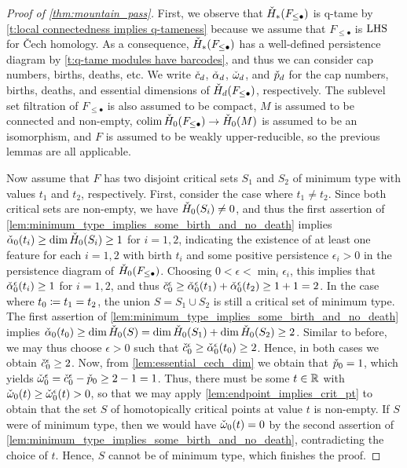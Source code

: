 \begin{proof}[Proof of \cref{thm:mountain_pass}]
    First, we observe that $\check{H}_*(F_{\leq \bullet})$ is q-tame by \cref{t:local connectedness implies q-tameness} because we assume that $F_{\leq \bullet}$ is $\mathrm{LHS}$ for \v{C}ech homology.
    As a consequence, $\check{H}_*(F_{\leq \bullet})$ has a well-defined persistence diagram by \cref{t:q-tame modules have barcodes}, and thus we can consider cap numbers, births, deaths, etc.
    We write $\check{c}_d$, $\check{\alpha}_d$, $\check{\omega}_d$, and $\check{p}_d$ for the cap numbers, births, deaths, and essential dimensions of $\check{H}_d(F_{\leq \bullet})$, respectively.
    The sublevel set filtration of $F_{\leq \bullet}$ is also assumed to be compact, $M$ is assumed to be connected and non-empty, $\operatorname*{colim} \check{H}_0(F_{\leq \bullet}) \to \check{H}_0(M)$ is assumed to be an isomorphism, and $F$ is assumed to be weakly upper-reducible, so the previous lemmas are all applicable.

	Now assume that $F$ has two disjoint critical sets $S_{1}$ and $S_{2}$ of minimum type with values $t_{1}$ and $t_{2}$, respectively.
	First, consider the case where $t_{1} \neq t_{2}$.
	Since both critical sets are non-empty, we have $\check{H}_{0}(S_{i}) \neq 0$, and thus the first assertion of \cref{lem:minimum_type_implies_some_birth_and_no_death} implies $\check{\alpha}_{0}(t_{i}) \geq \dim \check{H}_0(S_{i}) \geq 1$ for $i = 1,2$,
	indicating the existence of at least one feature for each $i = 1,2$ with birth $t_{i}$ and some positive persistence $\epsilon_i > 0$ in the persistence diagram of $\check{H}_0(F_{\leq \bullet})$.
	Choosing $0 < \epsilon < \min_i \epsilon_i$, this implies that
	$\check{\alpha}_{0}^{\epsilon}(t_{i}) \geq 1$ for $i = 1,2$,
	and thus
	$\check{c}_{0}^{\epsilon} \geq \check{\alpha}_{0}^{\epsilon}(t_{1}) + \check{\alpha}_{0}^{\epsilon}(t_{2}) \geq 1 + 1 = 2$.
	In the case where $t_{0} \coloneqq t_{1} = t_{2}$, the union $S = S_{1} \cup S_{2}$ is still a critical set of minimum type.
	The first assertion of \cref{lem:minimum_type_implies_some_birth_and_no_death} implies $\check{\alpha}_{0}(t_{0}) \geq \dim \check{H}_0(S) = \dim \check{H}_{0}(S_{1}) + \dim \check{H}_{0}(S_{2}) \geq 2$.
	Similar to before, we may thus choose $\epsilon > 0$ such that $\check{c}_{0}^{\epsilon} \geq \check{\alpha}_{0}^{\epsilon}(t_{0}) \geq 2$.
	Hence, in both cases we obtain $\check{c}_{0}^{\epsilon} \geq 2$.
	Now, from \cref{lem:essential_cech_dim} we obtain that $\check{p}_{0} = 1$, which yields $\check{\omega}_{0}^{\epsilon} = \check{c}_{0}^{\epsilon} - \check{p}_{0} \geq 2 - 1 = 1$.
	Thus, there must be some $t \in \mathbb{R}$ with $\check{\omega}_{0}(t) \geq \check{\omega}^{\epsilon}_{0}(t) > 0$, so that we may apply \cref{lem:endpoint_implies_crit_pt} to obtain that the set $S$ of homotopically critical points at value $t$ is non-empty.
	If $S$ were of minimum type, then we would have $\check{\omega}_{0}(t) = 0$ by the second assertion of \cref{lem:minimum_type_implies_some_birth_and_no_death}, contradicting the choice of $t$.
	Hence, $S$ cannot be of minimum type, which finishes the proof.
\end{proof}


